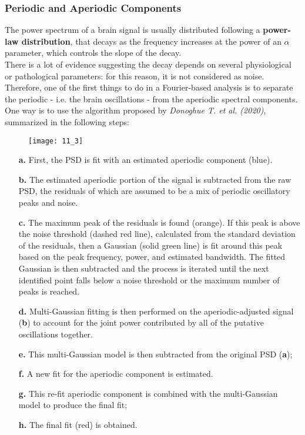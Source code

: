 \subsubsection{Periodic and Aperiodic Components}
The power spectrum of a brain signal is usually distributed following a \textbf{power-law distribution},
that decays as the frequency increases at the power of an \(\alpha\) parameter, which controls the slope
of the decay.\\
There is a lot of evidence suggesting the decay depends on several physiological or pathological parameters:
for this reason, it is not considered as noise.\\
Therefore, one of the first things to do in a Fourier-based analysis is to separate the periodic
- i.e. the brain oscillations - from the aperiodic spectral components. One way is to use the
algorithm proposed by \textit{Donoghue T. et al. (2020)}, summarized in the following steps:
\begin{figure}[H]
    \texttt{[image: 11\_3]}
    \centering
\end{figure}
\begin{itemize}
    \item[\textbf{a.}] First, the PSD is fit with an estimated aperiodic component (blue).
    \item[\textbf{b.}] The estimated aperiodic portion of the signal is subtracted from the raw PSD, the
        residuals of which are assumed to be a mix of periodic oscillatory peaks and noise.
    \item[\textbf{c.}] The maximum peak of the residuals is found (orange). If this peak is above the noise
        threshold (dashed red line), calculated from the standard deviation of the residuals, then a Gaussian
        (solid green line) is fit around this peak based on the peak frequency, power, and estimated bandwidth.
        The fitted Gaussian is then subtracted and the process is iterated until the next identified point
        falls below a noise threshold or the maximum number of peaks is reached.
    \item[\textbf{d.}] Multi-Gaussian fitting is then performed on the aperiodic-adjusted signal (\textbf{b})
        to account for the joint power contributed by all of the putative oscillations together.
    \item[\textbf{e.}] This multi-Gaussian model is then subtracted from the original PSD (\textbf{a});
    \item[\textbf{f.}] A new fit for the aperiodic component is estimated.
    \item[\textbf{g.}] This re-fit aperiodic component is combined with the multi-Gaussian model to produce
        the final fit;
    \item[\textbf{h.}] The final fit (red) is obtained.
\end{itemize}
